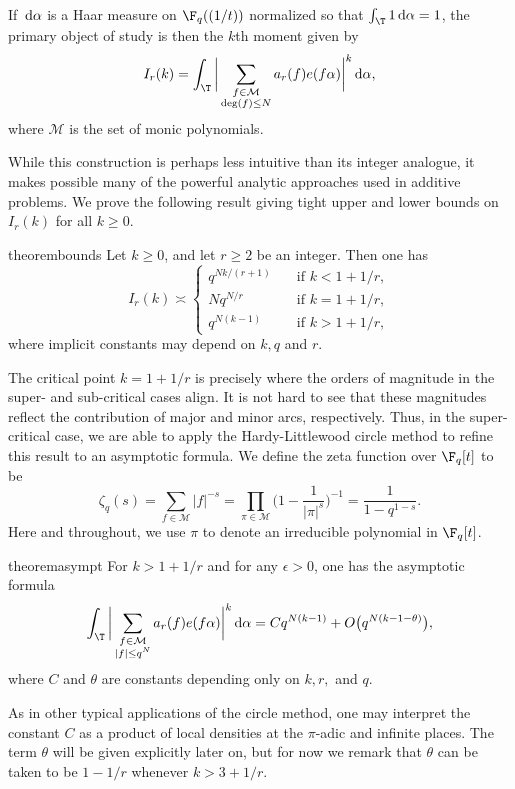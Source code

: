\documentclass[reqno,11pt]{amsart}
\theoremstyle{definition}
\theoremstyle{remark}
\numberwithin{equation}{section}
\def\calM{{\mathcal M}}
\renewcommand{\d}{\,{\rm d}} %
\newcommand{\<}{\begin{equation}}
\renewcommand{\>}{\end{equation}}
\begin{document}
If $\d \alpha$ is a Haar measure on $\F_q((1/t))$ normalized so that $\int_\T 1 \d \alpha = 1$, the primary object of study is then the $k$th moment given by
\[I_r(k) = \int_\T \bigg|\sum_{\substack{f \in \calM \\ \deg(f) \leq N}} a_r(f)e(f\alpha)\bigg|^k \d \alpha,\]
where $\calM$ is the set of monic polynomials.

While this construction is perhaps less intuitive than its integer analogue, it makes possible many of the powerful analytic approaches used in additive problems. We prove the following result giving tight upper and lower bounds on $I_r(k)$ for all $k\geq 0$.
\begin{restatable}{theorem}{bounds}\label{bounds}
    Let $k \geq 0$, and let $r \geq 2$ be an integer. Then one has
    \[I_r(k) \asymp \begin{cases}
        q^{Nk/(r+1)} \quad &\text{if } k<1+1/r, \\
        Nq^{N/r} \quad &\text{if } k=1+1/r, \\
        q^{N(k-1)} \quad &\text{if } k>1+1/r,
    \end{cases}\]
    where implicit constants may depend on $k,q$ and $r$.
\end{restatable}
The critical point $k=1+1/r$ is precisely where the orders of magnitude in the super- and sub-critical cases align. It is not hard to see that these magnitudes reflect the contribution of major and minor arcs, respectively. Thus, in the super-critical case, we are able to apply the Hardy-Littlewood circle method to refine this result to an asymptotic formula. We define the zeta function over $\F_q[t]$ to be
\[
\zeta_q(s) = \sum_{f \in \calM} |f|^{-s} = \prod_{\pi \in \calM} \bigg(1-\dfrac{1}{|\pi|^s}\bigg)^{-1} = \dfrac{1}{1-q^{1-s}}.
\]
Here and throughout, we use $\pi$ to denote an irreducible polynomial in $\F_q[t]$.
\begin{restatable}{theorem}{asympt}
    \label{asymp-formula}
    For $k>1+1/r$ and for any $\epsilon>0$, one has the asymptotic formula
    \[\int_\T \bigg|\sum_{\substack{f \in \calM \\ |f| \leq q^N}}a_r(f)e(f\alpha)\bigg|^k \d\alpha = Cq^{N(k-1)} + O\big(q^{N(k-1-\theta)}\big),\]
    where $C$ and $\theta$ are constants depending only on $k,r,$ and $q$.
\end{restatable}
As in other typical applications of the circle method, one may interpret the constant $C$ as a product of local densities at the $\pi$-adic and infinite places. The term $\theta$ will be given explicitly later on, but for now we remark that $\theta$ can be taken to be $1-1/r$ whenever $k>3+1/r$.
\end{document}
